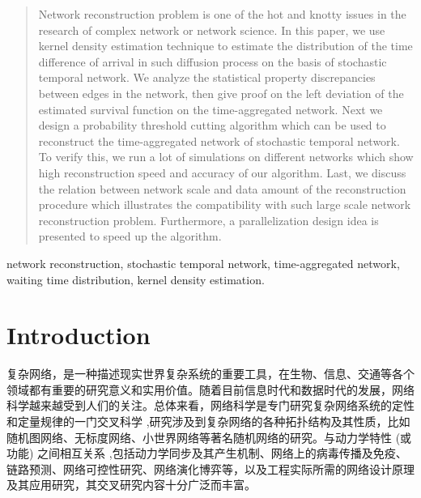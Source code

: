 \documentclass[journal]{IEEEtran}
\begin{document}
	
	\begin{abstract}
		Network reconstruction problem is one of the hot and knotty issues in the research of complex network or network science. In this paper, we use kernel density estimation technique to estimate the distribution of the time difference of arrival in such diffusion process on the basis of stochastic temporal network. We analyze the statistical property discrepancies between edges in the network, then give proof on the left deviation of the estimated survival function on the time-aggregated network. Next we design a probability threshold cutting algorithm which can be used to reconstruct the time-aggregated network of stochastic temporal network. To verify this, we run a lot of simulations on different networks which show high reconstruction speed and accuracy of our algorithm. Last, we discuss the relation between network scale and data amount of the reconstruction procedure which illustrates the compatibility with such large scale network reconstruction problem. Furthermore, a parallelization design idea is presented to speed up the algorithm.
	\end{abstract}
	
	\begin{keywords}
		network reconstruction, stochastic temporal network, time-aggregated network, waiting time distribution,  kernel density estimation.
	\end{keywords}
	
	\IEEEpeerreviewmaketitle
	
	
	
	\section{Introduction}
	复杂网络，是一种描述现实世界复杂系统的重要工具，在生物、信息、交通等各个领域都有重要的研究意义和实用价值。随着目前信息时代和数据时代的发展，网络科学越来越受到人们的关注。总体来看，网络科学是专门研究复杂网络系统的定性和定量规律的一门交叉科学 ,研究涉及到复杂网络的各种拓扑结构及其性质，比如随机图网络、无标度网络、小世界网络等著名随机网络的研究。与动力学特性 (或功能) 之间相互关系 ,包括动力学同步及其产生机制、网络上的病毒传播及免疫、链路预测、网络可控性研究、网络演化博弈等，以及工程实际所需的网络设计原理及其应用研究，其交叉研究内容十分广泛而丰富。
	
\end{document}
